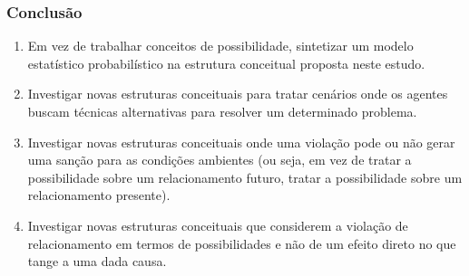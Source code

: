 \documentclass{beamer}
\begin{document}
\begin{frame}
	\frametitle{Conclusão}
	\begin{enumerate}
		\item Em vez de trabalhar conceitos de possibilidade, sintetizar um modelo estatístico probabilístico na estrutura conceitual proposta neste estudo.
		\item Investigar novas estruturas conceituais para tratar cenários onde os agentes buscam técnicas alternativas para resolver um determinado problema. 
		\item Investigar novas estruturas conceituais onde uma violação pode ou não gerar uma sanção para as condições ambientes (ou seja, em vez de tratar a possibilidade sobre um relacionamento futuro, tratar a possibilidade sobre um relacionamento presente).
		\item Investigar novas estruturas conceituais que considerem a violação de relacionamento em termos de possibilidades e não de um efeito direto no que tange a uma dada causa.   
	\end{enumerate}
\end{frame}
\end{document}
